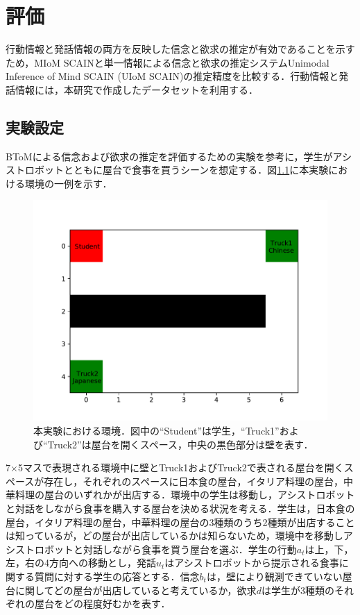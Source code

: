 \chapter{評価}
\par
行動情報と発話情報の両方を反映した信念と欲求の推定が有効であることを示すため，MIoM SCAINと単一情報による信念と欲求の推定システムUnimodal Inference of Mind SCAIN (UIoM SCAIN)の推定精度を比較する．行動情報と発話情報には，本研究で作成したデータセットを利用する．


\section{実験設定}
\par
BToMによる信念および欲求の推定を評価するための実験を参考に，学生がアシストロボットとともに屋台で食事を買うシーンを想定する．図\ref{fig:ex_env1}に本実験における環境の一例を示す．
\begin{figure}[htbp]
  \begin{center}
    \includegraphics[scale=0.7]{./ex_env1.pdf}
    \caption{本実験における環境．図中の``Student''は学生，``Truck1''および``Truck2''は屋台を開くスペース，中央の黒色部分は壁を表す．}
    \label{fig:ex_env1}
  \end{center}
\end{figure}
7$\times$5マスで表現される環境中に壁とTruck1およびTruck2で表される屋台を開くスペースが存在し，それぞれのスペースに日本食の屋台，イタリア料理の屋台，中華料理の屋台のいずれかが出店する．環境中の学生は移動し，アシストロボットと対話をしながら食事を購入する屋台を決める状況を考える．学生は，日本食の屋台，イタリア料理の屋台，中華料理の屋台の3種類のうち2種類が出店することは知っているが，どの屋台が出店しているかは知らないため，環境中を移動しアシストロボットと対話しながら食事を買う屋台を選ぶ．学生の行動$a_t$は上，下，左，右の4方向への移動とし，発話$u_t$はアシストロボットから提示される食事に関する質問に対する学生の応答とする．信念$b_t$は，壁により観測できていない屋台に関してどの屋台が出店していると考えているか，欲求$d$は学生が3種類のそれぞれの屋台をどの程度好むかを表す．



